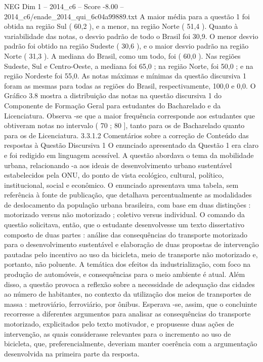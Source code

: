 \begin{textsample}{NEG Dim 1 – 2014\_c6 – Score -8.00 – 2014\_c6/enade\_2014\_qui\_6c04a99889.txt}
A maior média para a questão 1 foi obtida na região Sul ( 60,2 ), e a menor, na região Norte ( 51,4 ).
Quanto à variabilidade das notas, o desvio padrão de todo o Brasil foi 30,9.
O menor desvio padrão foi obtido na região Sudeste ( 30,6 ), e o maior desvio padrão na região Norte ( 31,3 ).
A mediana do Brasil, como um todo, foi ( 60,0 ).
Nas regiões Sudeste, Sul e Centro-Oeste, a mediana foi 65,0 ; na região Norte, foi 50,0 ; e na região Nordeste foi 55,0.
As notas máximas e mínimas da questão discursiva 1 foram as mesmas para todas as regiões do Brasil, respectivamente, 100,0 e 0,0.
O Gráfico 3.8 mostra a distribuição das notas na questão discursiva 1 do Componente de Formação Geral para estudantes do Bacharelado e da Licenciatura.
Observa -se que a maior frequência corresponde aos estudantes que obtiveram notas no intervalo ( 70 ; 80 ], tanto para os de Bacharelado quanto para os de Licenciatura. 3.3.1.2 Comentários sobre a correção de Conteúdo das respostas à Questão Discursiva 1 O enunciado apresentado da Questão 1 era claro e foi redigido em linguagem acessível.
A questão abordava o tema da mobilidade urbana, relacionando -a aos ideais de desenvolvimento urbano sustentável estabelecidos pela ONU, do ponto de vista ecológico, cultural, político, institucional, social e econômico.
O enunciado apresentava uma tabela, sem referência à fonte de publicação, que detalhava percentualmente as modalidades de deslocamento da população urbana brasileira, com base em duas distinções : motorizado versus não motorizado ; coletivo versus individual.
O comando da questão solicitava, então, que o estudante desenvolvesse um texto dissertativo composto de duas partes : análise das consequências do transporte motorizado para o desenvolvimento sustentável e elaboração de duas propostas de intervenção pautadas pelo incentivo ao uso da bicicleta, meio de transporte não motorizado e, portanto, não poluente.
A temática dos efeitos da industrialização, com foco na produção de automóveis, e consequências para o meio ambiente é atual.
Além disso, a questão provoca a reflexão sobre a necessidade de adequação das cidades ao número de habitantes, no contexto da utilização dos meios de transportes de massa : metroviário, ferroviário, por ônibus.
Esperava -se, assim, que o concluinte recorresse a diferentes argumentos para analisar as consequências do transporte motorizado, explicitados pelo texto motivador, e propusesse duas ações de intervenção, as quais considerasse relevantes para o incremento ao uso de bicicleta, que, preferencialmente, deveriam manter coerência com a argumentação desenvolvida na primeira parte da resposta.

\end{textsample}
